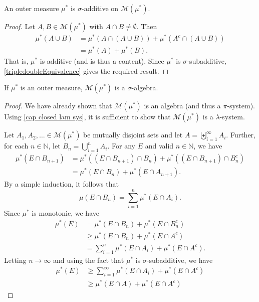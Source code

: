 \begin{lemma}
\label{outer measure is sig additive on M}
    An outer measure $\mu^*$ is $\sigma$-additive on $\mathcal{M}(\mu^*)$.
\end{lemma}
\begin{proof}
    Let $A,B\in\mathcal{M}(\mu^*)$ with $A\cap B\neq\emptyset$. Then
    \begin{align*}
        \mu^*(A\cup B) &= \mu^*(A\cap(A\cup B)) + \mu^*(A^c\cap(A\cup B)) \\
        &= \mu^*(A) + \mu^*(B).
    \end{align*}
    That is, $\mu^*$ is additive (and is thus a content). Since $\mu^*$ is $\sigma$-subadditive, \ref{tripledoubleEquivalence} gives the required result.
\end{proof}

\begin{lemma}
    If $\mu^*$ is an outer measure, $\mathcal{M}(\mu^*)$ is a $\sigma$-algebra.
\end{lemma}
\begin{proof}
    We have already shown that $\mathcal{M}(\mu^*)$ is an algebra (and thus a $\pi$-system). Using \ref{cap closed lam sys}, it is sufficient to show that $\mathcal{M}(\mu^*)$ is a $\lambda$-system.
    
    Let $A_1,A_2,\ldots\in\mathcal{M}(\mu^*)$ be mutually disjoint sets and let $A=\biguplus_{i=1}^\infty A_i$. Further, for each $n\in\mathbb{N}$, let $B_n=\bigcup_{i=1}^n A_i$. For any $E$ and valid $n\in\mathbb{N}$, we have
    \begin{align*}
        \mu^*(E\cap B_{n+1}) &= \mu^*((E\cap B_{n+1})\cap B_n) + \mu^*((E\cap B_{n+1})\cap B_n^c) \\
        &= \mu^*(E\cap B_n) + \mu^*(E\cap A_{n+1}).
    \end{align*}
    By a simple induction, it follows that
    $$\mu(E\cap B_{n})=\sum_{i=1}^n \mu^*(E\cap A_i).$$
    Since $\mu^*$ is monotonic, we have
    \begin{align*}
        \mu^*(E) &= \mu^*(E\cap B_n) + \mu^*(E\cap B_n^c) \\
        &\geq \mu^*(E\cap B_n) + \mu^*(E\cap A^c) \\
        &= \sum_{i=1}^n\mu^*(E\cap A_i) + \mu^*(E\cap A^c).
    \end{align*}
    Letting $n\to\infty$ and using the fact that $\mu^*$ is $\sigma$-subadditive, we have
    \begin{align*}
        \mu^*(E) &\geq \sum_{i=1}^\infty\mu^*(E\cap A_i) + \mu^*(E\cap A^c) \\
        &\geq \mu^*(E\cap A) + \mu^*(E\cap A^c)
    \end{align*}
\end{proof}

